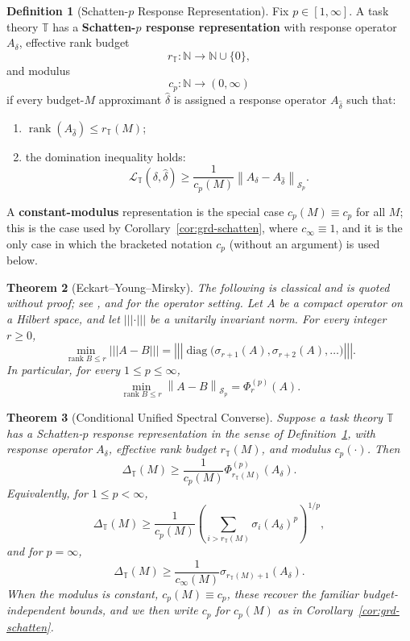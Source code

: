 \documentclass[12pt]{article}
\newtheorem{theorem}{Theorem}[section]
\theoremstyle{definition}
\newtheorem{definition}[theorem]{Definition}
\DeclareMathOperator{\rank}{rank}
\newcommand{\norm}[1]{\left\lVert#1\right\rVert}
\newcommand{\vertiii}[1]{%
  \left\lvert\left\lvert\left\lvert#1\right\rvert\right\rvert\right\rvert%
}
\newcommand{\Sp}[1]{\mathcal S_{#1}}
\begin{document}
\begin{definition}[Schatten-$p$ Response Representation]
\label{def:response}
Fix $p\in[1,\infty]$.  A task theory $\mathbb T$ has a
\textbf{Schatten-$p$ response representation} with response operator
$A_\delta$, effective rank budget
\[
r_{\mathbb T}:\mathbb N\to\mathbb N\cup\{0\},
\]
and modulus
\[
c_p:\mathbb N\to(0,\infty)
\]
if every budget-$M$ approximant $\widehat\delta$ is assigned a response
operator $A_{\widehat\delta}$ such that:
\begin{enumerate}[label=(\alph*)]
\item $\rank(A_{\widehat\delta})\le r_{\mathbb T}(M)$;
\item the domination inequality holds:
\[
\mathcal L_{\mathbb T}(\delta,\widehat\delta)
\ge
\frac1{c_p(M)}
\norm{A_\delta-A_{\widehat\delta}}_{\Sp{p}}.
\]
\end{enumerate}
A \textbf{constant-modulus} representation is the special case
$c_p(M)\equiv c_p$ for all $M$; this is the case used by
Corollary~\ref{cor:grd-schatten}, where $c_\infty\equiv1$, and it is the only
case in which the bracketed notation $c_p$ (without an argument) is used
below.
\end{definition}

\begin{theorem}[Eckart--Young--Mirsky]
\label{thm:mirsky}
The following is classical and is quoted without proof; see
\cite{eckart1936,mirsky1960}, and \cite{peller2003} for the operator setting.
Let $A$ be a compact operator on a Hilbert space, and let
$\vertiii{\cdot}$ be a unitarily invariant norm.  For every integer $r\ge0$,
\[
\min_{\rank B\le r}
\vertiii{A-B}
=
\vertiii{
\operatorname{diag}
\bigl(
\sigma_{r+1}(A),
\sigma_{r+2}(A),
\dots
\bigr)
}.
\]
In particular, for every $1\le p\le\infty$,
\[
\min_{\rank B\le r}
\norm{A-B}_{\Sp{p}}
=
\Phi^{(p)}_r(A).
\]
\end{theorem}

\begin{theorem}[Conditional Unified Spectral Converse]
\label{thm:unified}
Suppose a task theory $\mathbb T$ has a Schatten-$p$ response representation
in the sense of Definition~\ref{def:response}, with response operator
$A_\delta$, effective rank budget $r_{\mathbb T}(M)$, and modulus
$c_p(\cdot)$.  Then
\[
\Delta_{\mathbb T}(M)
\ge
\frac1{c_p(M)}
\Phi^{(p)}_{r_{\mathbb T}(M)}(A_\delta).
\]
Equivalently, for $1\le p<\infty$,
\[
\Delta_{\mathbb T}(M)
\ge
\frac1{c_p(M)}
\left(
\sum_{i>r_{\mathbb T}(M)}
\sigma_i(A_\delta)^p
\right)^{1/p},
\]
and for $p=\infty$,
\[
\Delta_{\mathbb T}(M)
\ge
\frac1{c_\infty(M)}
\sigma_{r_{\mathbb T}(M)+1}(A_\delta).
\]
When the modulus is constant, $c_p(M)\equiv c_p$, these recover the familiar
budget-independent bounds, and we then write $c_p$ for $c_p(M)$ as in
Corollary~\ref{cor:grd-schatten}.
\end{theorem}
\end{document}
